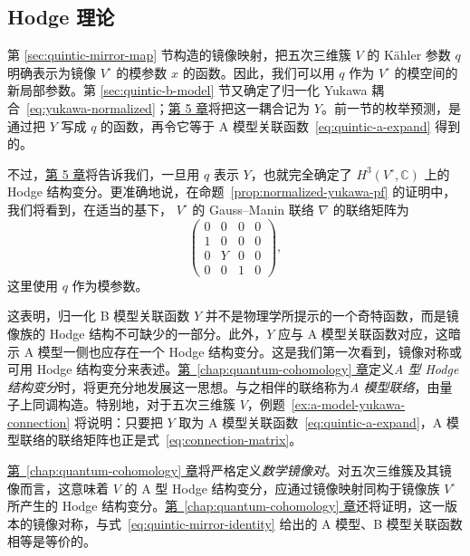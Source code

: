 \subsection{Hodge 理论}\label{subsec:quintic-hodge-theory}
第 \ref{sec:quintic-mirror-map} 节构造的镜像映射，把五次三维簇 $V$ 的 Kähler 参数 $q$ 明确表示为镜像 $V^\circ$ 的模参数 $x$ 的函数。因此，我们可以用 $q$ 作为 $V^\circ$ 的模空间的新局部参数。第 \ref{sec:quintic-b-model} 节又确定了归一化 Yukawa 耦合~\eqref{eq:yukawa-normalized}；\hyperref[chap:hodge-yukawa]{第 5 章}将把这一耦合记为 $Y$。前一节的枚举预测，是通过把 $Y$ 写成 $q$ 的函数，再令它等于 A 模型关联函数~\eqref{eq:quintic-a-expand} 得到的。

不过，\hyperref[chap:hodge-yukawa]{第 5 章}将告诉我们，一旦用 $q$ 表示 $Y$，也就完全确定了 $H^3(V^\circ,\mathbb C)$ 上的 Hodge 结构变分。更准确地说，在命题~\ref{prop:normalized-yukawa-pf} 的证明中，我们将看到，在适当的基下，
$V^\circ$ 的 Gauss--Manin 联络 $\nabla$ 的联络矩阵为
\begin{equation}\label{eq:connection-matrix}
\begin{pmatrix}
0&0&0&0\\
1&0&0&0\\
0&Y&0&0\\
0&0&1&0
\end{pmatrix},
\end{equation}
这里使用 $q$ 作为模参数。

这表明，归一化 B 模型关联函数 $Y$ 并不是物理学所提示的一个奇特函数，而是镜像族的 Hodge 结构不可缺少的一部分。此外，$Y$ 应与 A 模型关联函数对应，这暗示 A 模型一侧也应存在一个 Hodge 结构变分。这是我们第一次看到，镜像对称或可用 Hodge 结构变分来表述。\hyperref[chap:quantum-cohomology]{第~\ref*{chap:quantum-cohomology} 章}定义\emph{A 型 Hodge 结构变分}时，将更充分地发展这一思想。与之相伴的联络称为\emph{A 模型联络}，由量子上同调构造。特别地，对于五次三维簇 $V$，例题~\ref{ex:a-model-yukawa-connection} 将说明：只要把 $Y$ 取为 A 模型关联函数~\eqref{eq:quintic-a-expand}，A 模型联络的联络矩阵也正是式~\eqref{eq:connection-matrix}。

\hyperref[chap:quantum-cohomology]{第~\ref*{chap:quantum-cohomology} 章}将严格定义\emph{数学镜像对}。对五次三维簇及其镜像而言，这意味着 $V$ 的 A 型 Hodge 结构变分，应通过镜像映射同构于镜像族 $V^\circ$ 所产生的 Hodge 结构变分。\hyperref[chap:quantum-cohomology]{第~\ref*{chap:quantum-cohomology} 章}还将证明，这一版本的镜像对称，与式~\eqref{eq:quintic-mirror-identity} 给出的 A 模型、B 模型关联函数相等是等价的。

